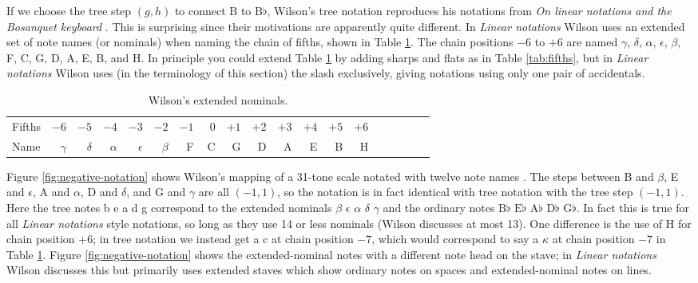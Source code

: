 \documentclass[a4paper,11pt]{article}
\begin{document}
\clearpage
If we choose the tree step $(g, h)$ to connect $\mathrm{B}$ to
$\mathrm{B}\flat$, Wilson's tree notation reproduces his notations from
\textit{On linear notations and the Bosanquet keyboard}
\cite{wilson1975linear}. This is surprising since their motivations are
apparently quite different. In \textit{Linear notations} Wilson uses an
extended set of note names (or nominals) when naming the chain of fifths, shown
in Table \ref{tab:wilson}. The chain positions $-6$ to $+6$ are named $\gamma$,
$\delta$, $\alpha$, $\epsilon$, $\beta$, F, C, G, D, A, E, B, and H. In
principle you could extend Table \ref{tab:wilson} by adding sharps and flats as
in Table \ref{tab:fifths}, but in \textit{Linear notations} Wilson uses (in the
terminology of this section) the slash exclusively, giving notations using only
one pair of accidentals.

\begin{table}
\begin{center}
\begin{tabular}{l|rrrrrrrrrrrrrrrrrr}
\toprule
Fifths & $-6$ & $-5$ & $-4$ & $-3$ & $-2$ & $-1$ & $\ \:0$ & $+1$ & $+2$ & $+3$ & $+4$ & $+5$ & $+6$ \\
Name & $\gamma$ & $\delta$ & $\alpha$ & $\epsilon$ & $\beta$ & F & C & G & D & A & E & B & H \\
\bottomrule
\end{tabular}
\end{center}
\caption{Wilson's extended nominals.}
\label{tab:wilson}
\end{table}

Figure \ref{fig:negative-notation} shows Wilson's mapping of a 31-tone scale
notated with twelve note names \cite[8]{wilson1975development}. The steps
between B and $\beta$, E and $\epsilon$, A and $\alpha$, D and $\delta$, and G
and $\gamma$ are all $(-1, 1)$, so the notation is in fact identical with tree
notation with the tree step $(-1, 1)$. Here the tree notes b e a d g correspond
to the extended nominals $\beta$ $\epsilon$ $\alpha$ $\delta$ $\gamma$ and the
ordinary notes $\mathrm{B}\flat$ $\mathrm{E}\flat$ $\mathrm{A}\flat$
$\mathrm{D}\flat$ $\mathrm{G}\flat$. In fact this is true for all
\textit{Linear notations} style notations, so long as they use 14 or less
nominals (Wilson discusses at most 13). One difference is the use of H for
chain position $+6$; in tree notation we instead get a c at chain position
$-7$, which would correspond to say a $\kappa$ at chain position $-7$ in Table
\ref{tab:wilson}. Figure \ref{fig:negative-notation} shows the extended-nominal
notes with a different note head on the stave; in \textit{Linear notations}
Wilson discusses this but primarily uses extended staves which show ordinary
notes on spaces and extended-nominal notes on lines.
\end{document}
